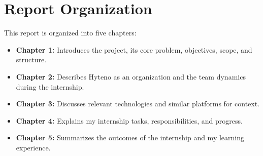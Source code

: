 \section{Report Organization}
This report is organized into five chapters:
\begin{itemize}
  \item \textbf{Chapter 1:} Introduces the project, its core problem, objectives, scope, and structure.
  \item \textbf{Chapter 2:} Describes Hyteno as an organization and the team dynamics during the internship.
  \item \textbf{Chapter 3:} Discusses relevant technologies and similar platforms for context.
  \item \textbf{Chapter 4:} Explains my internship tasks, responsibilities, and progress.
  \item \textbf{Chapter 5:} Summarizes the outcomes of the internship and my learning experience.
\end{itemize}

\newpage
